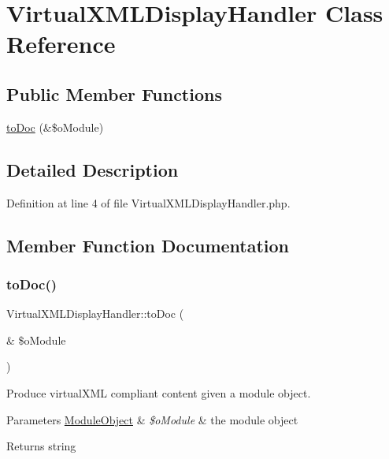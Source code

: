 \hypertarget{classVirtualXMLDisplayHandler}{}\section{Virtual\+X\+M\+L\+Display\+Handler Class Reference}
\label{classVirtualXMLDisplayHandler}
\subsection*{Public Member Functions}
\begin{DoxyCompactItemize}
\item 
\hyperlink{classVirtualXMLDisplayHandler_a2e96cf87736df31a1caa68b0a76c8503}{to\+Doc} (\&\$o\+Module)
\end{DoxyCompactItemize}


\subsection{Detailed Description}


Definition at line 4 of file Virtual\+X\+M\+L\+Display\+Handler.\+php.



\subsection{Member Function Documentation}
\hypertarget{classVirtualXMLDisplayHandler_a2e96cf87736df31a1caa68b0a76c8503}{}\label{classVirtualXMLDisplayHandler_a2e96cf87736df31a1caa68b0a76c8503} 
\subsubsection{\texorpdfstring{to\+Doc()}{toDoc()}}
{\footnotesize\ttfamily Virtual\+X\+M\+L\+Display\+Handler\+::to\+Doc (\begin{DoxyParamCaption}\item[{\&}]{\$o\+Module }\end{DoxyParamCaption})}

Produce virtual\+X\+ML compliant content given a module object.~\newline

\begin{DoxyParams}[1]{Parameters}
\hyperlink{classModuleObject}{Module\+Object} & {\em \$o\+Module} & the module object \\
\hline
\end{DoxyParams}
\begin{DoxyReturn}{Returns}
string 
\end{DoxyReturn}



